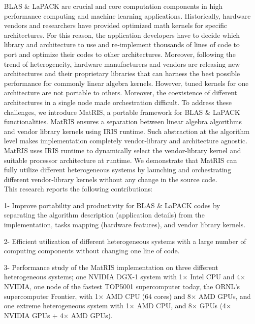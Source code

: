 BLAS \& LaPACK are crucial and core computation components in high performance computing and machine learning applications. Historically, hardware vendors and researchers have provided optimized math kernels for specific architectures. For this reason, the application developers have to decide which library and architecture to use and re-implement thousands of lines of code to port and optimize their codes to other architectures. Moreover, following the trend of heterogeneity, hardware manufacturers and vendors are releasing new architectures and their proprietary libraries that can harness the best possible performance for commonly linear algebra kernels. However, tuned kernels for one architecture are not portable to others. Moreover, the coexistence of different architectures in a single node made orchestration difficult. To address these challenges, we introduce MatRIS, a portable framework for BLAS \& LaPACK functionalities. MatRIS ensures a separation between linear algebra algorithms and vendor library kernels using IRIS runtime. Such abstraction at the algorithm level makes implementation completely vendor-library and architecture agnostic. MatRIS uses IRIS runtime to dynamically select the vendor-library kernel and suitable processor architecture at runtime. We demonstrate that MatRIS can fully utilize different heterogeneous systems by launching and orchestrating different vendor-library kernels without any change in the source code.\\

This research reports the following contributions:

1- Improve portability and productivity for BLAS \& LaPACK codes by separating the algorithm description (application details) from the implementation, tasks mapping (hardware features), and vendor library kernels.

2- Efficient utilization of different heterogeneous systems with a large number of computing components without changing one line of code.

3- Performance study of the MatRIS implementation on three different heterogeneous systems; one NVIDIA DGX-1 system with 1× Intel CPU and 4× NVIDIA, one node of the fastest TOP5001 supercomputer today, the ORNL’s supercomputer Frontier, with 1× AMD CPU (64 cores) and 8× AMD GPUs, and one extreme heterogeneous system with 1× AMD CPU, and 8× GPUs (4× NVIDIA GPUs + 4× AMD GPUs). 